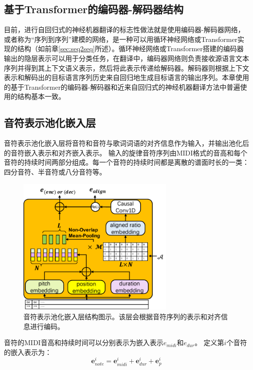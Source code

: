 \subsection{基于Transformer的编码器-解码器结构}
\label{sec:ast_transformer_enc_dec}
目前，进行自回归式的神经机器翻译的标志性做法就是使用编码器-解码器网络，或者称为``序列到序列''建模的网络，是一种可以用循环神经网络或Transformer实现的结构（如前章\ref{sec:seq2seq}所述）。循环神经网络或Transformer搭建的编码器输出的隐层表示可以用于分类任务，在翻译中，编码器网络则负责接收源语言文本序列并得到其上下文语义表示，然后将此表示传递给解码器。解码器则根据上下文表示和解码出的目标语言序列历史来自回归地生成目标语言的输出序列。本章使用的基于Transformer的编码器-解码器和近来自回归式的神经机器翻译方法中普遍使用的结构基本一致。
\label{sec:transformer_enc_dec}
\subsection{音符表示池化嵌入层}
\label{sec:note_pooling}
音符表示池化嵌入层将音符和音符与歌词词语的对齐信息作为输入，并输出池化后的音符嵌入表示和对齐嵌入表示。
输入的旋律音符序列由MIDI格式的音高和每个音符的持续时间两部分组成。每一个音符的持续时间都是离散的谱面时长的一类：四分音符、半音符或八分音符等。
\begin{figure}[t]
    \centering
    \label{fig:align_enc}
    \includegraphics[width=0.69\textwidth,clip=true]{figure/ast/note-pooling.pdf}
    \caption{音符表示池化嵌入层结构图示。该层会根据音符序列的表示和对齐信息进行编码。}
    \label{fig:align_enc}
\end{figure}
音符的MIDI音高和持续时间可以分别表示为嵌入表示$e_{midi}$和$e_{dur}$。
定义第$i$个音符的嵌入表示为：
\begin{equation}
\label{eq:note}
    \mathbf{e}_{note}^i=\mathbf{e}_{midi}^i+\mathbf{e}_{dur}^i+\mathbf{e}_p^i
\end{equation}
